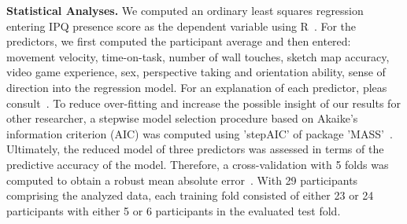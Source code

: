\indent \textbf{Statistical Analyses.}
We computed an ordinary least squares regression entering IPQ presence score as the dependent variable using R~\cite{rver}. For the predictors, we first computed the participant average and then entered: movement velocity, time-on-task, number of wall touches, sketch map accuracy, video game experience, sex, perspective taking and orientation ability, sense of direction into the regression model. For an explanation of each predictor, pleas consult~\cite{gehrke2018}. To reduce over-fitting and increase the possible insight of our results for other researcher, a stepwise model selection procedure based on Akaike's information criterion (AIC) was computed using 'stepAIC' of package 'MASS'~\cite{aic, mass}.
Ultimately, the reduced model of three predictors was assessed in terms of the predictive accuracy of the model. Therefore, a cross-validation with 5 folds was computed to obtain a robust mean absolute error~\cite{cv, mae}. With 29 participants comprising the analyzed data, each training fold consisted of either 23 or 24 participants with either 5 or 6 participants in the evaluated test fold.


